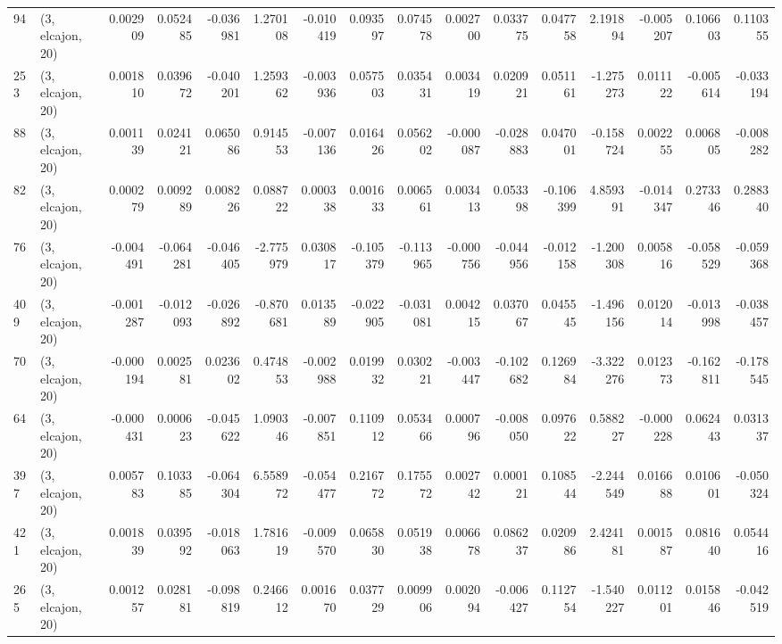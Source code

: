 \begin{tabular}{llrrrrrrrrrrrrrr}
94  &  (3, elcajon, 20) &   0.002909 &  0.052485 & -0.036981 &     1.270108 &  -0.010419 &   0.093597 &   0.074578 &  0.002700 &  0.033775 &  0.047758 &    2.191894 & -0.005207 &  0.106603 &  0.110355 \\
253 &  (3, elcajon, 20) &   0.001810 &  0.039672 & -0.040201 &     1.259362 &  -0.003936 &   0.057503 &   0.035431 &  0.003419 &  0.020921 &  0.051161 &   -1.275273 &  0.011122 & -0.005614 & -0.033194 \\
88  &  (3, elcajon, 20) &   0.001139 &  0.024121 &  0.065086 &     0.914553 &  -0.007136 &   0.016426 &   0.056202 & -0.000087 & -0.028883 &  0.047001 &   -0.158724 &  0.002255 &  0.006805 & -0.008282 \\
82  &  (3, elcajon, 20) &   0.000279 &  0.009289 &  0.008226 &     0.088722 &   0.000338 &   0.001633 &   0.006561 &  0.003413 &  0.053398 & -0.106399 &    4.859391 & -0.014347 &  0.273346 &  0.288340 \\
76  &  (3, elcajon, 20) &  -0.004491 & -0.064281 & -0.046405 &    -2.775979 &   0.030817 &  -0.105379 &  -0.113965 & -0.000756 & -0.044956 & -0.012158 &   -1.200308 &  0.005816 & -0.058529 & -0.059368 \\
409 &  (3, elcajon, 20) &  -0.001287 & -0.012093 & -0.026892 &    -0.870681 &   0.013589 &  -0.022905 &  -0.031081 &  0.004215 &  0.037067 &  0.045545 &   -1.496156 &  0.012014 & -0.013998 & -0.038457 \\
70  &  (3, elcajon, 20) &  -0.000194 &  0.002581 &  0.023602 &     0.474853 &  -0.002988 &   0.019932 &   0.030221 & -0.003447 & -0.102682 &  0.126984 &   -3.322276 &  0.012373 & -0.162811 & -0.178545 \\
64  &  (3, elcajon, 20) &  -0.000431 &  0.000623 & -0.045622 &     1.090346 &  -0.007851 &   0.110912 &   0.053466 &  0.000796 & -0.008050 &  0.097622 &    0.588227 & -0.000228 &  0.062443 &  0.031337 \\
397 &  (3, elcajon, 20) &   0.005783 &  0.103385 & -0.064304 &     6.558972 &  -0.054477 &   0.216772 &   0.175572 &  0.002742 &  0.000121 &  0.108544 &   -2.244549 &  0.016688 &  0.010601 & -0.050324 \\
421 &  (3, elcajon, 20) &   0.001839 &  0.039592 & -0.018063 &     1.781619 &  -0.009570 &   0.065830 &   0.051938 &  0.006678 &  0.086237 &  0.020986 &    2.424181 &  0.001587 &  0.081640 &  0.054416 \\
265 &  (3, elcajon, 20) &   0.001257 &  0.028181 & -0.098819 &     0.246612 &   0.001670 &   0.037729 &   0.009906 &  0.002094 & -0.006427 &  0.112754 &   -1.540227 &  0.011201 &  0.015846 & -0.042519 \\

\end{tabular}
